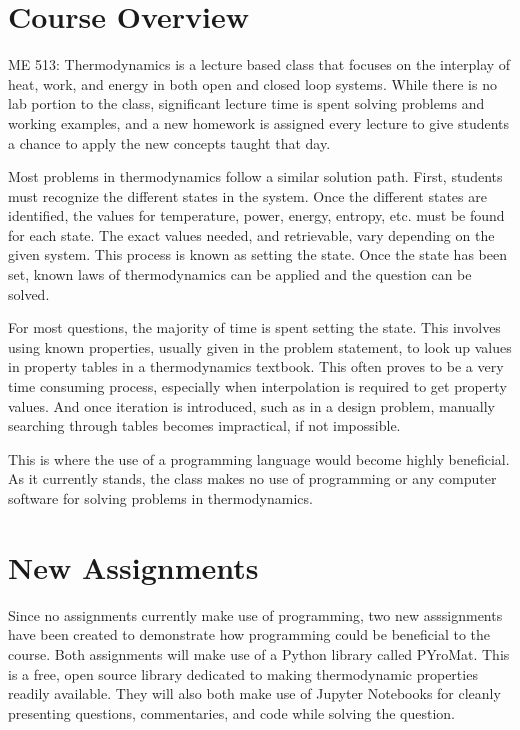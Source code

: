 \section{Course Overview}

ME 513: Thermodynamics is a lecture based class that focuses on the interplay of heat, work, and energy in both
open and closed loop systems. While there is no lab portion to the class, significant lecture time is spent
solving problems and working examples, and a new homework is assigned every lecture to give students a chance
to apply the new concepts taught that day.

Most problems in thermodynamics follow a similar solution path. First, students must recognize the different
states in the system. Once the different states are identified, the values for temperature, power, energy,
entropy, etc. must be found for each state. The exact values needed, and retrievable, vary depending on the
given system. This process is known as setting the state. Once the state has been set, known laws of
thermodynamics can be applied and the question can be solved.

For most questions, the majority of time is spent setting the state. This involves using known properties, 
usually given in the problem statement, to look up values in property tables in a thermodynamics textbook. 
This often proves to be a very time consuming process, especially when interpolation is required to get 
property values. And once iteration is introduced, such as in a design problem, manually searching through
tables becomes impractical, if not impossible.

This is where the use of a programming language would become highly beneficial. As it currently stands, the 
class makes no use of programming or any computer software for solving problems in thermodynamics. 

\section{New Assignments}

Since no assignments currently make use of programming, two new asssignments have been created to demonstrate
how programming could be beneficial to the course. Both assignments will make use of a Python library called
PYroMat. This is a free, open source library dedicated to making thermodynamic properties readily available.
They will also both make use of Jupyter Notebooks for cleanly presenting questions, commentaries, and code
while solving the question.

